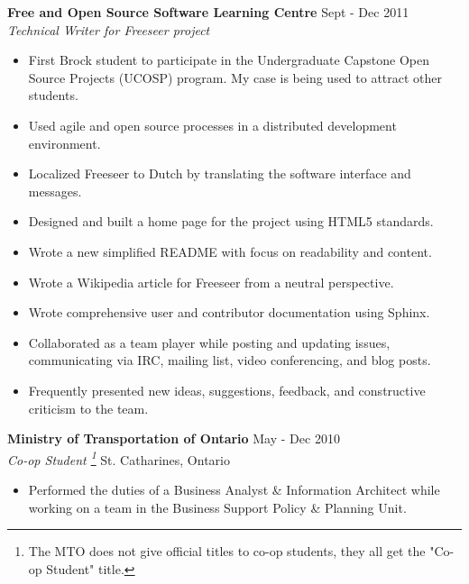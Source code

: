 \documentclass[margin]{res}
\begin{document}
\begin{resume}
	\textbf{Free and Open Source Software Learning Centre} \hfill Sept - Dec 2011 \\
    {\sl Technical Writer for Freeseer project} \hfill %
	\begin{itemize}  \itemsep -2pt %
	  \item First Brock student to participate in the Undergraduate Capstone Open Source Projects
	  (UCOSP) program. My case is being used to attract other students.
	  \item Used agile and open source processes in a distributed development environment.
	  \item Localized Freeseer to Dutch by translating the software interface and messages.
	  \item Designed and built a home page for the project using HTML5 standards.
    \item Wrote a new simplified README with focus on readability and content.
	  \item Wrote a Wikipedia article for Freeseer from a neutral perspective.
	  \item Wrote comprehensive user and contributor documentation using Sphinx.
	  \item Collaborated as a team player while posting and updating issues,
	  communicating via IRC, mailing list, video conferencing, and blog posts.
	  \item Frequently presented new ideas, suggestions, feedback, and constructive criticism to the team.
	\end{itemize}

	\textbf{Ministry of Transportation of Ontario} \hfill May - Dec 2010 \\
    {\sl Co-op Student \footnote{The MTO does not give official titles to co-op students,
    they all get the "Co-op Student" title.}} \hfill St. Catharines, Ontario
	\begin{itemize}  \itemsep -2pt %
	  \item Performed the duties of a Business Analyst \& Information Architect %
	  while working on a team in the Business Support Policy \& Planning Unit.
	\end{itemize}



\end{resume}
\end{document}
